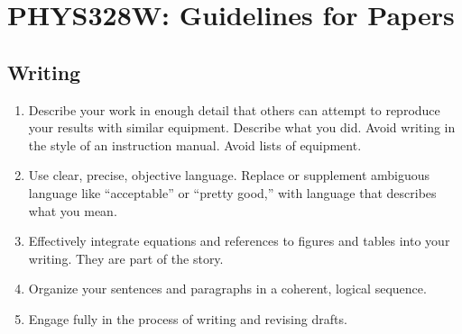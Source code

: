 \documentclass[11 pt]{article}
\begin{document}
\section*{PHYS328W: Guidelines for Papers}

\subsection*{Writing}
\begin{enumerate}
\item Describe your work in enough detail that others can attempt to
  reproduce your results with similar equipment. Describe what you
  did. Avoid writing in the style of an instruction
  manual. Avoid lists of equipment.  

\item Use clear, precise, objective language. Replace or supplement
  ambiguous language like ``acceptable'' or ``pretty good,'' with
  language that describes what you mean.

\item Effectively integrate equations and references to figures and
  tables into your writing. They are part of the story. 

\item Organize your sentences and paragraphs in a coherent, logical
  sequence. 

\item Engage fully in the process of writing and revising drafts.

\end{enumerate}
\end{document}
